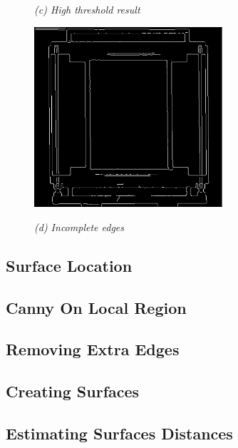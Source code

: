 \begin{figure}[htb]
\begin{minipage}[t]{2.75in}
    \centerline{\emph{(c) High threshold result}}
  \end{minipage}\medskip
  \begin{minipage}[t]{2.75in}
    \centering
    \centerline{\mbox{\includegraphics[width=2.75in]{data_extraction/images/canny/cases/Canny_issue_missing_edges.eps}}}
    \centerline{\emph{(d) Incomplete edges}}
  \end{minipage}
\end{figure}

\subsection{Surface Location}

\subsection{Canny On Local Region}

\subsection{Removing Extra Edges}

\subsection{Creating Surfaces}

\subsection{Estimating Surfaces Distances}
